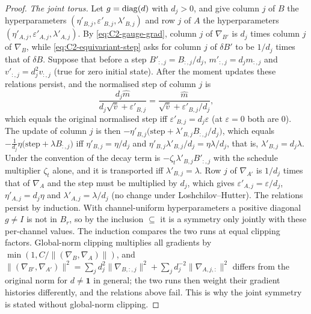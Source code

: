 \begin{proof}
\emph{The joint torus.} Let $g=\operatorname{diag}(d)$ with $d_j>0$, and give column $j$ of $B$ the hyperparameters
$(\eta'_{B,j},\varepsilon'_{B,j},\lambda'_{B,j})$ and row $j$ of $A$ the hyperparameters $(\eta'_{A,j},\varepsilon'_{A,j},\lambda'_{A,j})$.
By \eqref{eq:C2-gauge-grad}, column $j$ of $\nabla_{B'}$ is $d_j$ times column $j$ of $\nabla_B$, while
\eqref{eq:C2-equivariant-step} asks for column $j$ of $\delta B'$ to be $1/d_j$ times that of $\delta B$. Suppose that before
a step $B'_{:,j}=B_{:,j}/d_j$, $m'_{:,j}=d_jm_{:,j}$ and $v'_{:,j}=d_j^2v_{:,j}$ (true for zero initial state). After the
moment updates these relations persist, and the normalised step of column $j$ is
\[\frac{d_j\hat m}{d_j\sqrt{\hat v}+\varepsilon'_{B,j}}=\frac{\hat m}{\sqrt{\hat v}+\varepsilon'_{B,j}/d_j},\]
which equals the original normalised step iff $\varepsilon'_{B,j}=d_j\varepsilon$ (at $\varepsilon=0$ both are $0$). The
update of column $j$ is then $-\eta'_{B,j}\big(\text{step}+\lambda'_{B,j}B_{:,j}/d_j\big)$, which equals
$-\tfrac1{d_j}\eta\big(\text{step}+\lambda B_{:,j}\big)$ iff $\eta'_{B,j}=\eta/d_j$ and $\eta'_{B,j}\lambda'_{B,j}/d_j=\eta\lambda/d_j$,
that is, $\lambda'_{B,j}=d_j\lambda$. Under the convention of \citet{xloshchilov2019decoupled} the decay term is
$-\zeta_t\lambda'_{B,j}B'_{:,j}$ with the schedule multiplier $\zeta_t$ alone, and it is transported iff $\lambda'_{B,j}=\lambda$.
Row $j$ of $\nabla_{A'}$ is $1/d_j$ times that of $\nabla_A$ and the step must be multiplied by $d_j$, which gives
$\varepsilon'_{A,j}=\varepsilon/d_j$, $\eta'_{A,j}=d_j\eta$ and $\lambda'_{A,j}=\lambda/d_j$ (no change under
Loshchilov--Hutter). The relations persist by induction. With channel-uniform hyperparameters a positive diagonal
$g\ne I$ is not in $B_r$, so by the inclusion $\subseteq$ it is a symmetry only jointly with these per-channel values.
The induction compares the two runs at equal clipping factors. Global-norm clipping multiplies all gradients by
$\min(1,C/\lVert(\nabla_B,\nabla_A)\rVert)$, and
$\lVert(\nabla_{B'},\nabla_{A'})\rVert^2=\sum_jd_j^2\lVert\nabla_{B,:,j}\rVert^2+\sum_jd_j^{-2}\lVert\nabla_{A,j,:}\rVert^2$
differs from the original norm for $d\ne\mathbf 1$ in general; the two runs then weight their gradient histories
differently, and the relations above fail. This is why the joint symmetry is stated without global-norm clipping.


\end{proof}
